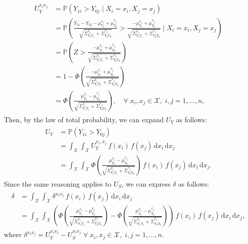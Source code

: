\documentclass[12pt]{article}
\newcommand{\Prob}{\mathbb{P}}
\begin{document}
\begin{align}
    \begin{split}
        U^{x_{i} x_{j}}_{Y} & = \Prob \left( Y_{1i} > Y_{0j} \mid X_{i} = x_{i}, X_{j} = x_{j} \right) \\
        & = \Prob \left( \frac{Y_{1i} - Y_{0j} - \mu^{x_{i}}_{Y_{1}} + \mu^{x_{j}}_{Y_{0}}}{\sqrt{\Sigma^{x_{i}}_{Y_{1} Y_{1}} + \Sigma^{x_{j}}_{Y_{0} Y_{0}}}} > \frac{- \mu^{x_{i}}_{Y_{1}} + \mu^{x_{j}}_{Y_{0}}}{\sqrt{\Sigma^{x_{i}}_{Y_{1} Y_{1}} + \Sigma^{x_{j}}_{Y_{0} Y_{0}}}} \mid X_{i} = x_{i}, X_{j} = x_{j} \right) \\
        & = \Prob \left( Z > \frac{- \mu^{x_{i}}_{Y_{1}} + \mu^{x_{j}}_{Y_{0}}}{\sqrt{\Sigma^{x_{i}}_{Y_{1} Y_{1}} + \Sigma^{x_{j}}_{Y_{0} Y_{0}}}} \right) \\
        & = 1 - \Phi \left( \frac{- \mu^{x_{i}}_{Y_{1}} + \mu^{x_{j}}_{Y_{0}}}{\sqrt{\Sigma^{x_{i}}_{Y_{1} Y_{1}} + \Sigma^{x_{j}}_{Y_{0} Y_{0}}}} \right) \\
        & = \Phi \left( \frac{\mu^{x_{i}}_{Y_{1}} - \mu^{x_{j}}_{Y_{0}}}{\sqrt{\Sigma^{x_{i}}_{Y_{1} Y_{1}} + \Sigma^{x_{j}}_{Y_{0} Y_{0}}}} \right) , \quad \forall \; x_{i}, x_{j} \in \mathcal{X}, \; i,j = 1, \ldots, n,
    \end{split}
\end{align}
Then, by the law of total probability, we can expand \(U_{Y}\) as follows:
\begin{align}
    \begin{split}
        U_{Y} & = \Prob \left( Y_{1i} > Y_{0j} \right) \\
        & = \int_{\mathcal{X}} \int_{\mathcal{X}} U^{x_{i}, x_{j}}_{Y} \, f (x_{i}) \, f (x_{j}) \, \text{d}x_{i} \, \text{d}x_{j} \\
        & = \int_{\mathcal{X}} \int_{\mathcal{X}} \Phi \left( \frac{\mu^{x_{i}}_{Y_{1}} - \mu^{x_{j}}_{Y_{0}}}{\sqrt{\Sigma^{x_{i}}_{Y_{1} Y_{1}} + \Sigma^{x_{j}}_{Y_{0} Y_{0}}}} \right) \, f (x_{i}) \, f (x_{j}) \, \text{d}x_{i} \, \text{d}x_{j}.
    \end{split}
\end{align}
Since the same reasoning applies to \(U_{S}\), we can express \(\delta\) as follows:
\begin{align}
    \begin{split}
        \delta & = \int_{\mathcal{X}} \int_{\mathcal{X}} \delta^{x_{i} x_{j}} \, f (x_{i}) \, f (x_{j}) \, \text{d}x_{i} \, \text{d}x_{j} \\
        & = \int_{\mathcal{X}} \int_{\mathcal{X}} \left( \Phi \left( \frac{\mu^{x_{i}}_{Y_{1}} - \mu^{x_{j}}_{Y_{0}}}{\sqrt{\Sigma^{x_{i}}_{Y_{1} Y_{1}} + \Sigma^{x_{j}}_{Y_{0} Y_{0}}}} \right) - \Phi \left( \frac{\mu^{x_{i}}_{S_{1}} - \mu^{x_{j}}_{S_{0}}}{\sqrt{\Sigma^{x_{i}}_{S_{1} S_{1}} + \Sigma^{x_{j}}_{S_{0} S_{0}}}} \right) \right) \, f (x_{i}) \, f (x_{j}) \, \text{d}x_{i} \, \text{d}x_{j},
    \end{split}
\end{align}
where \( \delta^{x_{i} x_{j}} = U^{x_{i} x_{j}}_{Y} - U^{x_{i} x_{j}}_{S} \; \forall \; x_{i}, x_{j} \in \mathcal{X}, \; i,j = 1, \ldots, n\).
\end{document}
